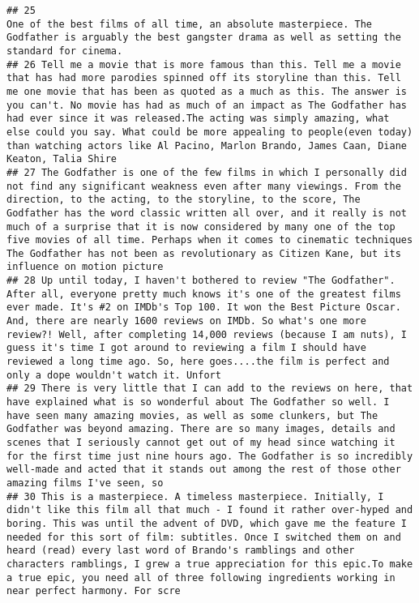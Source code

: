 \documentclass[
]{article}
\begin{document}
\begin{verbatim}
## 25                                                                                                                                                                                                                                                                                                                                                            One of the best films of all time, an absolute masterpiece. The Godfather is arguably the best gangster drama as well as setting the standard for cinema.
## 26 Tell me a movie that is more famous than this. Tell me a movie that has had more parodies spinned off its storyline than this. Tell me one movie that has been as quoted as a much as this. The answer is you can't. No movie has had as much of an impact as The Godfather has had ever since it was released.The acting was simply amazing, what else could you say. What could be more appealing to people(even today) than watching actors like Al Pacino, Marlon Brando, James Caan, Diane Keaton, Talia Shire 
## 27 The Godfather is one of the few films in which I personally did not find any significant weakness even after many viewings. From the direction, to the acting, to the storyline, to the score, The Godfather has the word classic written all over, and it really is not much of a surprise that it is now considered by many one of the top five movies of all time. Perhaps when it comes to cinematic techniques The Godfather has not been as revolutionary as Citizen Kane, but its influence on motion picture
## 28 Up until today, I haven't bothered to review "The Godfather". After all, everyone pretty much knows it's one of the greatest films ever made. It's #2 on IMDb's Top 100. It won the Best Picture Oscar. And, there are nearly 1600 reviews on IMDb. So what's one more review?! Well, after completing 14,000 reviews (because I am nuts), I guess it's time I got around to reviewing a film I should have reviewed a long time ago. So, here goes....the film is perfect and only a dope wouldn't watch it. Unfort
## 29 There is very little that I can add to the reviews on here, that have explained what is so wonderful about The Godfather so well. I have seen many amazing movies, as well as some clunkers, but The Godfather was beyond amazing. There are so many images, details and scenes that I seriously cannot get out of my head since watching it for the first time just nine hours ago. The Godfather is so incredibly well-made and acted that it stands out among the rest of those other amazing films I've seen, so
## 30 This is a masterpiece. A timeless masterpiece. Initially, I didn't like this film all that much - I found it rather over-hyped and boring. This was until the advent of DVD, which gave me the feature I needed for this sort of film: subtitles. Once I switched them on and heard (read) every last word of Brando's ramblings and other characters ramblings, I grew a true appreciation for this epic.To make a true epic, you need all of three following ingredients working in near perfect harmony. For scre

\end{verbatim}
\end{document}
